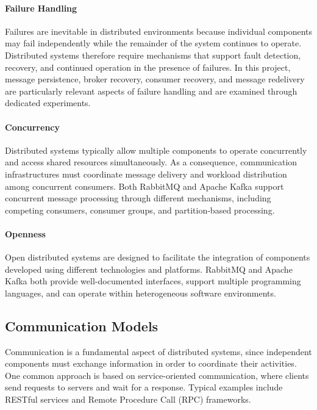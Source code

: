 \documentclass{scrartcl}
\begin{document}
\paragraph{Failure Handling}

Failures are inevitable in distributed environments because individual
components may fail independently while the remainder of the system continues to
operate. Distributed systems therefore require mechanisms that support fault detection,
recovery, and continued operation in the presence of failures. In this project,
message persistence, broker recovery, consumer recovery, and message redelivery
are particularly relevant aspects of failure handling and are examined through
dedicated experiments.

\paragraph{Concurrency}

Distributed systems typically allow multiple components to operate concurrently and access shared resources simultaneously. As a consequence, communication infrastructures must coordinate message delivery and workload distribution among concurrent consumers. Both RabbitMQ and Apache Kafka support concurrent message processing through different mechanisms, including competing consumers, consumer groups, and partition-based processing.

\paragraph{Openness}

Open distributed systems are designed to facilitate the integration of components developed using different technologies and platforms. RabbitMQ and Apache Kafka both provide well-documented interfaces, support multiple programming languages, and can operate within heterogeneous software environments. 

\subsection{Communication Models}

Communication is a fundamental aspect of distributed systems, since independent components must exchange information in order to coordinate their activities. One common approach is based on service-oriented communication, where clients send requests to servers and wait for a response. Typical examples include RESTful services and Remote Procedure Call (RPC) frameworks.
\end{document}
